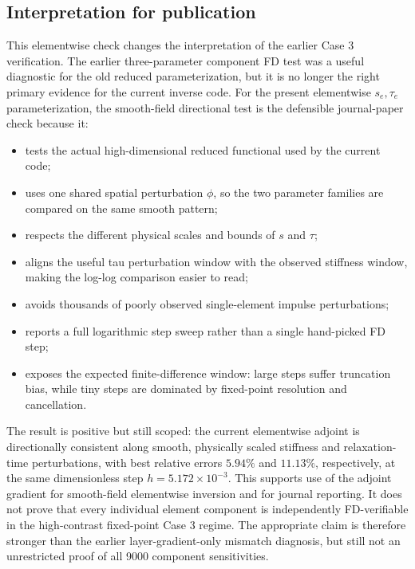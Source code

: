 \documentclass[11pt]{article}
\begin{document}
\subsection*{Interpretation for publication}
This elementwise check changes the interpretation of the earlier Case 3 verification.
The earlier three-parameter component FD test was a useful diagnostic for the old reduced parameterization, but it is no longer the right primary evidence for the current inverse code.
For the present elementwise \(s_e,\tau_e\) parameterization, the smooth-field directional test is the defensible journal-paper check because it:
\begin{itemize}
\item tests the actual high-dimensional reduced functional used by the current code;
\item uses one shared spatial perturbation \(\phi\), so the two parameter families are compared on the same smooth pattern;
\item respects the different physical scales and bounds of \(s\) and \(\tau\);
\item aligns the useful tau perturbation window with the observed stiffness window, making the log-log comparison easier to read;
\item avoids thousands of poorly observed single-element impulse perturbations;
\item reports a full logarithmic step sweep rather than a single hand-picked FD step;
\item exposes the expected finite-difference window: large steps suffer truncation bias, while tiny steps are dominated by fixed-point resolution and cancellation.
\end{itemize}

The result is positive but still scoped: the current elementwise adjoint is directionally consistent along smooth, physically scaled stiffness and relaxation-time perturbations, with best relative errors \(5.94\%\) and \(11.13\%\), respectively, at the same dimensionless step \(h=5.172\times10^{-3}\).
This supports use of the adjoint gradient for smooth-field elementwise inversion and for journal reporting.
It does not prove that every individual element component is independently FD-verifiable in the high-contrast fixed-point Case 3 regime.
The appropriate claim is therefore stronger than the earlier layer-gradient-only mismatch diagnosis, but still not an unrestricted proof of all 9000 component sensitivities.
\end{document}
